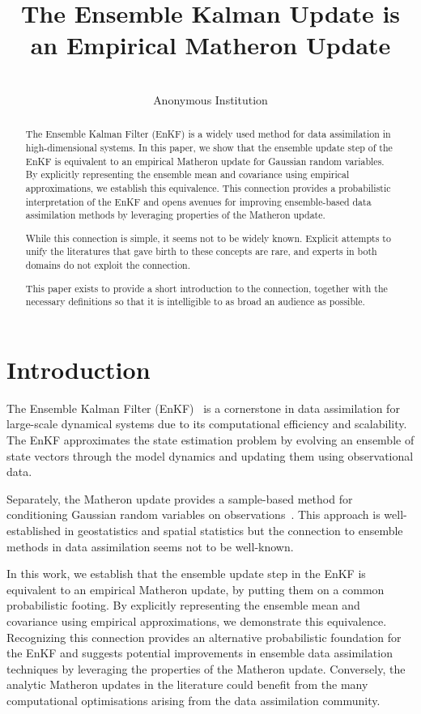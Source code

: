\documentclass[wcp]{jmlr} %
\title[Ensemble Kalman Update]{The Ensemble Kalman Update is an Empirical Matheron Update}
\author{\Name{Anonymous Authors}\\
  \addr Anonymous Institution}
\begin{document}
\maketitle

\begin{abstract}
The Ensemble Kalman Filter (EnKF) is a widely used method for data assimilation in high-dimensional systems. In this paper, we show that the ensemble update step of the EnKF is equivalent to an empirical Matheron update for Gaussian random variables. By explicitly representing the ensemble mean and covariance using empirical approximations, we establish this equivalence. This connection provides a probabilistic interpretation of the EnKF and opens avenues for improving ensemble-based data assimilation methods by leveraging properties of the Matheron update.

While this connection is simple, it seems not to be widely known. Explicit attempts to unify the literatures that gave birth to these concepts are rare, and experts in both domains do not exploit the connection.

This paper exists to provide a short introduction to the connection, together with the necessary definitions so that it is intelligible to as broad an audience as possible.
\end{abstract}

\section{Introduction}
The Ensemble Kalman Filter (EnKF)~\citep{Evensen2003Ensemble,Evensen2009Data} is a cornerstone in data assimilation for large-scale dynamical systems due to its computational efficiency and scalability.
The EnKF approximates the state estimation problem by evolving an ensemble of state vectors through the model dynamics and updating them using observational data.

Separately, the Matheron update provides a sample-based method for conditioning Gaussian random variables on observations~\citep{Doucet2010Note,Wilson2020Efficiently,Wilson2021Pathwise}.
This approach is well-established in geostatistics and spatial statistics but the connection to ensemble methods in data assimilation seems not to be well-known.

In this work, we establish that the ensemble update step in the EnKF is equivalent to an empirical Matheron update, by putting them on a common probabilistic footing.
By explicitly representing the ensemble mean and covariance using empirical approximations, we demonstrate this equivalence.
Recognizing this connection provides an alternative probabilistic foundation for the EnKF and suggests potential improvements in ensemble data assimilation techniques by leveraging the properties of the Matheron update.
Conversely, the analytic Matheron updates in the literature could benefit from the many computational optimisations arising from the data assimilation community.
\end{document}
